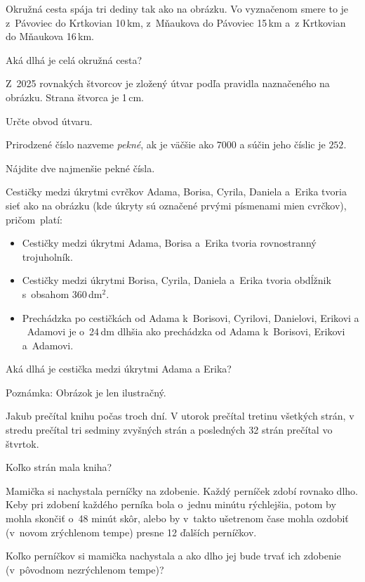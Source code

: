 {%
Okružná cesta spája tri dediny tak ako na obrázku.
Vo vyznačenom smere to je z~Pávoviec do Krtkovian 10\,km, z~Mňaukova do Pávoviec 15\,km a~z Krtkovian do Mňaukova 16\,km.

Aká dlhá je celá okružná cesta?
%
}

{%
Z~2025 rovnakých štvorcov je zložený útvar podľa pravidla naznačeného na obrázku.
Strana štvorca je 1\,cm.

Určte obvod útvaru.
%
}

{%
Prirodzené číslo nazveme \emph{pekné}, ak je väčšie ako $7000$ a súčin jeho číslic je $252$.

Nájdite dve najmenšie pekné čísla.
}

{%
Cestičky medzi úkrytmi cvrčkov Adama, Borisa, Cyrila, Daniela a~Erika tvoria sieť ako na obrázku
(kde úkryty sú označené prvými písmenami mien cvrčkov), pričom~platí:
\begin{itemize}
 \item Cestičky medzi úkrytmi Adama, Borisa a~Erika tvoria rovnostranný trojuholník.
 \item Cestičky medzi úkrytmi Borisa, Cyrila, Daniela a~Erika tvoria obdĺžnik s~obsahom 360\,dm$^2$.
 \item Prechádzka po cestičkách od Adama k~Borisovi, Cyrilovi, Danielovi, Erikovi a ~Adamovi je o~24\,dm dlhšia ako prechádzka od Adama k~Borisovi, Erikovi a~Adamovi.
\end{itemize}

\noindent
Aká dlhá je cestička medzi úkrytmi Adama a Erika?
%

Poznámka: Obrázok je len ilustračný.}

{%
Jakub prečítal knihu počas troch dní. V utorok prečítal tretinu všetkých strán, v stredu prečítal tri sedminy zvyšných strán a posledných 32 strán prečítal vo štvrtok.

Koľko strán mala kniha?
}

{%
Mamička si nachystala perníčky na zdobenie.
Každý perníček zdobí rovnako dlho.
Keby pri zdobení každého perníka bola o~jednu minútu rýchlejšia, potom by mohla skončiť o~48 minút skôr, alebo by v~takto ušetrenom čase mohla ozdobiť (v~novom zrýchlenom tempe) presne 12 ďalších perníčkov.

Koľko perníčkov si mamička nachystala a ako dlho jej bude trvať ich zdobenie
(v~pôvodnom nezrýchlenom tempe)?
}

